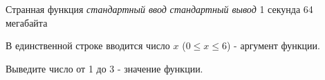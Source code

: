 \begin{problem}%
{Странная функция}%
{\textsl{стандартный ввод}}%
{\textsl{стандартный вывод}}%
{1 секунда}%
{64 мегабайта}{}

\InputFile

В единственной строке вводится число $x$ ($0 \le x \le 6$) - аргумент функции.

\OutputFile

Выведите число от 1 до 3 - значение функции.

\end{problem}
